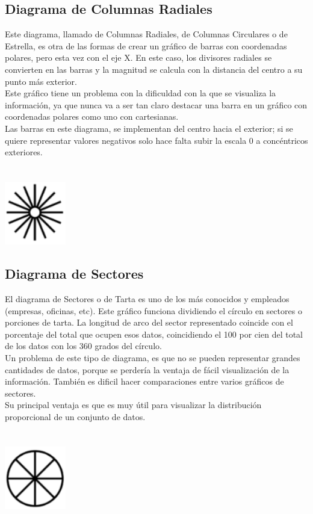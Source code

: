 \documentclass{article}\usepackage[]{graphicx}\usepackage[]{color}
\begin{document}
\subsection{Diagrama de Columnas Radiales} \label{ssec:colRadiales}
Este diagrama, llamado de Columnas Radiales, de Columnas Circulares o de Estrella, es otra de las formas de crear un gr\'afico de barras con coordenadas polares, pero esta vez con el eje X. En este caso, los divisores radiales se convierten en las barras y la magnitud se calcula con la distancia del centro a su punto m\'as exterior.~\\
Este gr\'afico tiene un problema con la dificuldad con la que se visualiza la informaci\'on, ya que nunca va a ser tan claro destacar una barra en un gr\'afico con coordenadas polares como uno con cartesianas.~\\
Las barras en este diagrama, se implementan del centro hacia el exterior; si se quiere representar valores negativos solo hace falta subir la escala 0 a conc\'entricos exteriores.
~\\~\\~\\
\vbox{
    \centering
    \includegraphics[width=0.2\textwidth]{imag/columnas}
}
\subsection{Diagrama de Sectores}
El diagrama de Sectores o de Tarta es uno de los m\'as conocidos y empleados (empresas, oficinas, etc). Este gr\'afico funciona dividiendo el c\'irculo en sectores o porciones de tarta. La longitud de arco del sector representado coincide con el porcentaje del total que ocupen esos datos, coincidiendo el 100 por cien del total de los datos con los 360 grados del c\'irculo.~\\
Un problema de este tipo de diagrama, es que no se pueden representar grandes cantidades de datos, porque se perder\'ia la ventaja de f\'acil visualizaci\'on de la informaci\'on.
Tambi\'en es dificil hacer comparaciones entre varios gr\'aficos de sectores.~\\
Su principal ventaja es que es muy \'util para visualizar la distribuci\'on proporcional de un conjunto de datos.
~\\~\\~\\
\vbox{
    \centering
    \includegraphics[width=0.2\textwidth]{imag/sectores}
}
\clearpage
\end{document}
